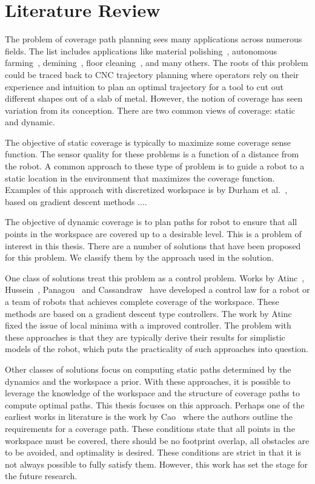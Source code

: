 \documentclass[../main.tex]{subfiles}
\begin{document}
\chapter{Literature Review}
\label{chapter:literature_review}

The problem of coverage path planning sees many applications across numerous fields. The list includes applications like material polishing~\cite{rososhansky2010coverage}, autonomous farming~\cite{ollis1997vision}, demining~\cite{acar2003path}, floor cleaning~\cite{yasutomi1988cleaning}, and many others. The roots of this problem could be traced back to CNC trajectory planning where operators rely on their experience and intuition to plan an optimal trajectory for a tool to cut out different shapes out of a slab of metal. However, the notion of coverage has seen variation from its conception. There are two common views of coverage: static and dynamic.

The objective of static coverage is typically to maximize some coverage sense function. The sensor quality for these problems is a function of a distance from the robot. A common approach to these type of problem is to guide a robot to a static location in the environment that maximizes the coverage function. Examples of this approach with discretized workspace is by Durham et al.~\cite{durham2012discrete}, based on gradient descent methods ....

The objective of dynamic coverage is to plan paths for robot to ensure that all points in the workspace are covered up to a desirable level. This is a problem of interest in this thesis. There are a number of solutions that have been proposed for this problem. We classify them by the approach used in the solution.

One class of solutions treat this problem as a control problem. Works by Atinc~\cite{atincc2013supervised}, Hussein~\cite{hussein2007effective}, Panagou~\cite{panagou2014vision} and Cassandraw~\cite{cassandras2013optimal} have developed a control law for a robot or a team of robots that achieves complete coverage of the workspace. These methods are based on a gradient descent type controllers. The work by Atinc~\cite{atincc2013supervised} fixed the issue of local minima with a improved controller. The problem with these approaches is that they are typically derive their results for simplistic models of the robot, which puts the practicality of such approaches into question. 

Other classes of solutions focus on computing static paths determined by the dynamics and the workspace a prior. With these approaches, it is possible to leverage the knowledge of the workspace and the structure of coverage paths to compute optimal paths. This thesis focuses on this approach.  Perhaps one of the earliest works in literature is the work by Cao~\cite{cao1988region} where the authors outline the requirements for a coverage path. These conditions state that all points in the workspace must be covered, there should be no footprint overlap, all obstacles are to be avoided, and optimality is desired. These conditions are strict in that it is not always possible to fully satisfy them. However, this work has set the stage for the future research.
\end{document}
